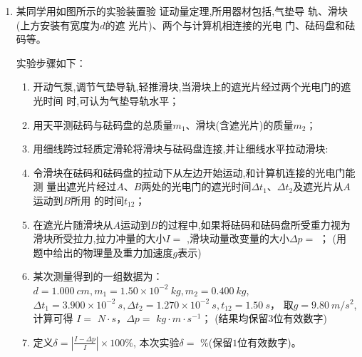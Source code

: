 \begin{enumerate}



\item 
某同学用如图所示的实验装置验
证动量定理,所用器材包括,气垫导
轨、滑块(上方安装有宽度为$ d $的遮
光片)、两个与计算机相连接的光电
门、砝码盘和砝码等。

\begin{figure}[h!]
\centering

\end{figure}


实验步骤如下：

\begin{enumerate}
\item
开动气泵,调节气垫导轨,轻推滑块,当滑块上的遮光片经过两个光电门的遮
光时间 \underlinegap 时,可认为气垫导轨水平；

\item 
用天平测砝码与砝码盘的总质量$ m_{1} $、滑块(含遮光片)的质量$ m_2 $；
\item 
用细线跨过轻质定滑轮将滑块与砝码盘连接,并让细线水平拉动滑块:
\item 
令滑块在砝码和砝码盘的拉动下从左边开始运动,和计算机连接的光电门能测
量出遮光片经过$ A $、$ B $两处的光电门的遮光时间$ \Delta t_{1} $、$ \Delta t_2 $及遮光片从$ A $运动到$ B $所用
的时间$ t_{ 12 } $；


\item 
在遮光片随滑块从$ A $运动到$ B $的过程中,如果将砝码和砝码盘所受重力视为
滑块所受拉力,拉力冲量的大小$ I= $ \underlinegap 
,滑块动量改变量的大小$ \Delta p= $ \underlinegap ； 
(用
题中给出的物理量及重力加速度$ g $表示)

\item 
某次测量得到的一组数据为：$ d=1.000 \ cm , m_{1}=1.50 \times 10^{-2} \ kg, m_{2} =0.400 \ kg $,
$ \Delta t_{1}=3.900 \times 10^{-2} \ s , \Delta t_2=1.270 \times 10^{-2} \ s, t_{ 12}=1.50 \ s $，
取$ g=9.80 \ m/s^{2} $,计算可得
$ I = $ \underlinegap $ N \cdot s $，$ \Delta p = $ \underlinegap $ kg \cdot m \cdot s^{-1} $；
(结果均保留$ 3 $位有效数字)

\item 
定义$ \delta=\left|\frac{I-\Delta p}{I}\right| \times 100 \% $, 本次实验$ \delta= $ \underlinegap 
$ \% $(保留$ 1 $位有效数字)。

\end{enumerate}


\end{enumerate}
